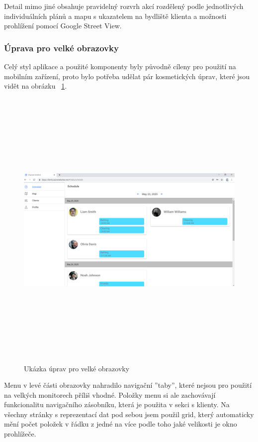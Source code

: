 \documentclass[
  biblatex,
  glossaries,
  index
]{kidiplom}
\begin{document}
Detail mimo jiné obsahuje pravidelný rozvrh akcí rozdělený podle jednotlivých individuálních plánů a mapu s ukazatelem na bydliště klienta a možnosti prohlížení pomocí Google Street View.

\subsubsection{Úprava pro velké obrazovky}
Celý styl aplikace a použité komponenty byly původně cíleny pro použití na mobilním zařízení, proto bylo potřeba udělat pár kosmetických úprav, které jsou vidět na obrázku ~\ref{fig:bigScreen}. 

\begin{figure}[H]
  	\centering
 	 \includegraphics[width=14cm,height=14cm,keepaspectratio]{big_screen}
 	 \caption{Ukázka úprav pro velké obrazovky}
 	 \label{fig:bigScreen}
\end{figure}

Menu v levé části obrazovky nahradilo navigační ''taby'', které nejsou pro použití na velkých monitorech příliš vhodné. Položky menu si ale zachovávají funkcionalitu navigačního zásobníku, která je použita v sekci s klienty. Na všechny stránky s reprezentací dat pod sebou jsem použil grid, který automaticky mění počet položek v řádku z jedné na více podle toho jaké velikosti je okno prohlížeče.
\end{document}
